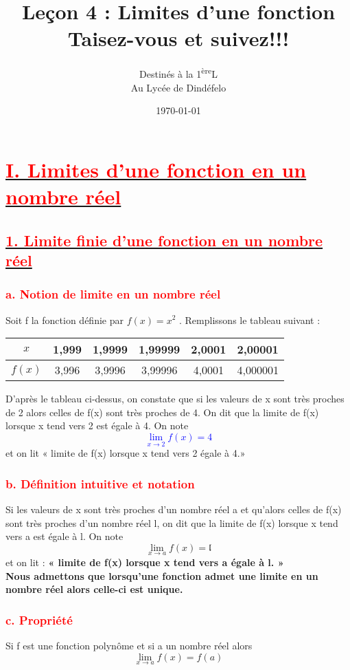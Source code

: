 \documentclass[12pt]{article}
\author{Destinés à la 1\textsuperscript{ère}L\\Au Lycée de Dindéfelo}
\title{\textbf{Leçon 4 : Limites d’une fonction\\Taisez-vous et suivez!!!}}
\date{\today}
\begin{document}
\maketitle
\newpage
\section*{\underline{\textbf{\textcolor{red}{I. Limites d’une fonction en un nombre réel}}}}
\subsection*{\underline{\textbf{\textcolor{red}{1. Limite finie d’une fonction en un nombre réel}}}}
\subsubsection*{\textcolor{red}{a. Notion de limite en un nombre réel}}
Soit f la fonction définie par $f(x) = x^{2}$ . Remplissons le tableau suivant :\\
\begin{center}
\begin{tabular}{|c|c|c|c|c|c|}
\hline
$x$ & 1,999 & 1,9999 & 1,99999 & 2,0001 & 2,00001\\
\hline
$f(x)$ &3,996 &3,9996 &3,99996 & 4,0001&4,000001\\
\hline
\end{tabular}
\end{center}
D’après le tableau ci-dessus, on constate que si les valeurs de x sont très proches de 2 alors celles de f(x) sont très proches de 4. On dit que la limite de f(x) lorsque x tend vers 2 est égale à 4. On note \textcolor{blue}{\[\lim_{x \to 2}f(x)=4\]} et on lit « limite de f(x) lorsque x tend vers 2 égale à 4.»
\subsubsection*{\textcolor{red}{b. Définition intuitive et notation}}
Si les valeurs de x sont très proches d’un nombre réel a et qu’alors celles de f(x) sont très
proches d’un nombre réel l, on dit que la limite de f(x) lorsque x tend vers a est égale à l. On note \[\lim_{x \to a}f(x)=\mathfrak{l}\] et on lit : \textbf{« limite de f(x) lorsque x tend vers a égale à l. »}\\
\textbf{Nous admettons que lorsqu’une fonction admet une limite en un nombre réel alors celle-ci est unique.} 
\subsubsection*{\textcolor{red}{c. Propriété}}
Si f est une fonction polynôme et si a un nombre réel alors \[\lim_{x \to a}f(x)=f(a)\]
\end{document}
